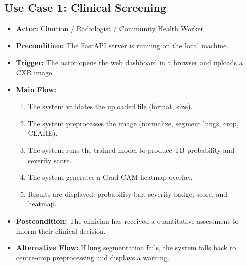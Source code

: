 \documentclass[12pt]{report}
\begin{document}
\subsection{Use Case 1: Clinical Screening}
\begin{itemize}
    \item \textbf{Actor:} Clinician / Radiologist / Community Health Worker
    \item \textbf{Precondition:} The FastAPI server is running on the local machine.
    \item \textbf{Trigger:} The actor opens the web dashboard in a browser and uploads a CXR image.
    \item \textbf{Main Flow:}
    \begin{enumerate}
        \item The system validates the uploaded file (format, size).
        \item The system preprocesses the image (normalize, segment lungs, crop, CLAHE).
        \item The system runs the trained model to produce TB probability and severity score.
        \item The system generates a Grad-CAM heatmap overlay.
        \item Results are displayed: probability bar, severity badge, score, and heatmap.
    \end{enumerate}
    \item \textbf{Postcondition:} The clinician has received a quantitative assessment to inform their clinical decision.
    \item \textbf{Alternative Flow:} If lung segmentation fails, the system falls back to centre-crop preprocessing and displays a warning.
\end{itemize}
\end{document}
